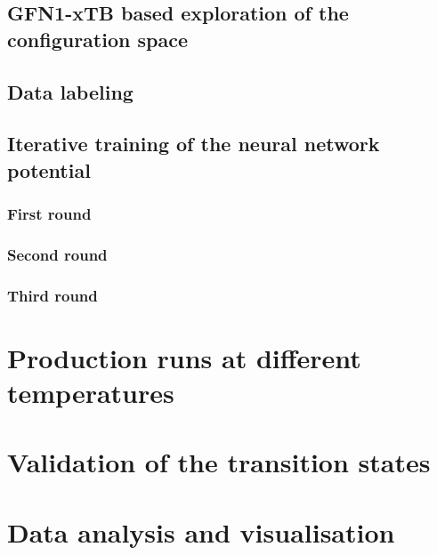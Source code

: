 \subsection{GFN1-xTB based exploration of the configuration space}

\subsection{Data labeling}

\subsection{Iterative training of the neural network potential}

\subsubsection{First round}

\subsubsection{Second round}

\subsubsection{Third round}



\section{Production runs at different temperatures}



\section{Validation of the transition states}



\section{Data analysis and visualisation}